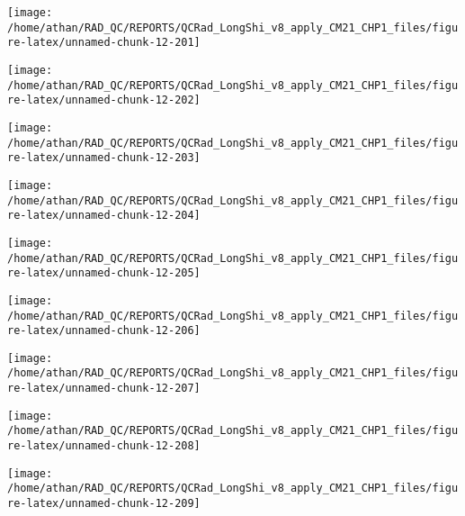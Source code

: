 \documentclass[
  10pt,
  a4paper,oneside]{article}
\begin{document}
\begin{center}\texttt{[image: /home/athan/RAD\_QC/REPORTS/QCRad\_LongShi\_v8\_apply\_CM21\_CHP1\_files/figure-latex/unnamed-chunk-12-201]} \end{center}

\begin{center}\texttt{[image: /home/athan/RAD\_QC/REPORTS/QCRad\_LongShi\_v8\_apply\_CM21\_CHP1\_files/figure-latex/unnamed-chunk-12-202]} \end{center}

\begin{center}\texttt{[image: /home/athan/RAD\_QC/REPORTS/QCRad\_LongShi\_v8\_apply\_CM21\_CHP1\_files/figure-latex/unnamed-chunk-12-203]} \end{center}

\begin{center}\texttt{[image: /home/athan/RAD\_QC/REPORTS/QCRad\_LongShi\_v8\_apply\_CM21\_CHP1\_files/figure-latex/unnamed-chunk-12-204]} \end{center}

\begin{center}\texttt{[image: /home/athan/RAD\_QC/REPORTS/QCRad\_LongShi\_v8\_apply\_CM21\_CHP1\_files/figure-latex/unnamed-chunk-12-205]} \end{center}

\begin{center}\texttt{[image: /home/athan/RAD\_QC/REPORTS/QCRad\_LongShi\_v8\_apply\_CM21\_CHP1\_files/figure-latex/unnamed-chunk-12-206]} \end{center}

\begin{center}\texttt{[image: /home/athan/RAD\_QC/REPORTS/QCRad\_LongShi\_v8\_apply\_CM21\_CHP1\_files/figure-latex/unnamed-chunk-12-207]} \end{center}

\begin{center}\texttt{[image: /home/athan/RAD\_QC/REPORTS/QCRad\_LongShi\_v8\_apply\_CM21\_CHP1\_files/figure-latex/unnamed-chunk-12-208]} \end{center}

\begin{center}\texttt{[image: /home/athan/RAD\_QC/REPORTS/QCRad\_LongShi\_v8\_apply\_CM21\_CHP1\_files/figure-latex/unnamed-chunk-12-209]} \end{center}
\end{document}
